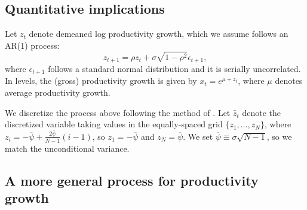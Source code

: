 \subsection{Quantitative implications}

Let $z_t$ denote demeaned log productivity growth, which we assume follows an AR(1) process:
\begin{equation}
    z_{t+1} = \rho z_t + \sigma \sqrt{1-\rho^2}\epsilon_{t+1},
\end{equation}
where $\epsilon_{t+1}$ follows a standard normal distribution and it is serially uncorrelated. In levels, the (gross) productivity growth is given by $x_t = e^{\mu+z_t} $, where $\mu$ denotes average productivity growth. 

We discretize the process above following the method of \citet{rouwenhurst1995asset}. Let $\hat{z}_t$ denote the discretized variable taking values in the equally-spaced grid  $\{z_{1}, \ldots, z_N \}$, where $z_i = -\overline{\psi}  + \frac{2 \overline{\psi}}{N-1} (i-1) $, so $z_1 = -\overline{\psi}$ and $z_N =  \overline{\psi}$. We set $\overline{\psi} \equiv \sigma \sqrt{N-1}$, so we match the unconditional variance. 

\subsection{A more general process for productivity growth}\label{sec:discretization}

